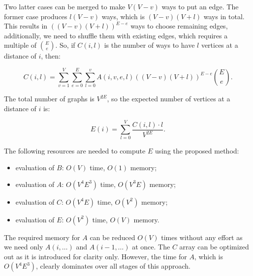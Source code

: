 \documentclass{llncs}
\begin{document}
  Two latter cases can be merged to make $V (V - v)$ ways to put an edge. The former case
  produces $l (V - v)$ ways, which is $(V - v) (V + l)$ ways in total. 
  This results in $((V - v) (V + l))^{E-e}$ ways to choose remaining edges, additionally,
  we need to shuffle them with existing edges, which requires a multiple of $\binom{E}{e}$.
  So, if $C(i,l)$ is the number of ways to have $l$ vertices at a distance of $i$, then:
  
  $$C(i,l) = \sum_{v = 1}^{V} \sum_{e = 0}^{E} \sum_{l = 0}^{v} A(i,v,e,l) ((V - v)(V + l))^{E - e} \binom{E}{e}.$$
  
  The total number of graphs is $V^{2E}$, so the expected number of vertices at a distance of $i$ is:
  
  $$E(i) = \sum_{l=0}^{V} \frac{C(i,l) \cdot l}{V^{2E}}.$$
  
  The following resources are needed to compute $E$ using the proposed method:
  \begin{itemize}
  \item evaluation of $B$: $O(V)$ time, $O(1)$ memory;
  \item evaluation of $A$: $O(V^4 E^3)$ time, $O(V^3 E)$ memory;
  \item evaluation of $C$: $O(V^4 E)$ time,   $O(V^2)$ memory;
  \item evaluation of $E$: $O(V^2)$ time,     $O(V)$ memory.
  \end{itemize}
  
  The required memory for $A$ can be reduced $O(V)$ times without any effort 
  as we need only $A(i, \ldots)$ and $A(i - 1, \ldots)$ at once.
  The $C$ array can be optimized out as it is introduced for clarity only.
  However, the time for $A$, which is $O(V^4 E^3)$, clearly dominates over all stages of this approach.
 
 
\end{document}
